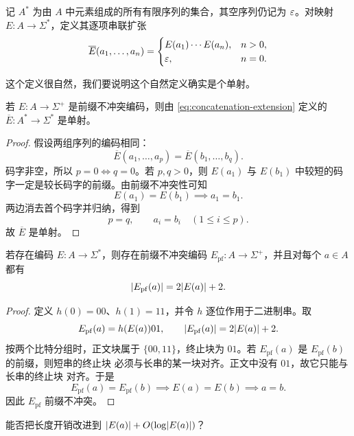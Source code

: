 记 $A^*$ 为由 $A$ 中元素组成的所有有限序列的集合，其空序列仍记为
$\varepsilon$。对映射 $E:A\to\Sigma^*$，定义其逐项串联扩张
\begin{equation}
  \label{eq:concatenation-extension}
  \overline E(a_1,\ldots,a_n)=
  \begin{cases}
    E(a_1)\cdots E(a_n), & n>0,\\
    \varepsilon, & n=0.
  \end{cases}
\end{equation}

这个定义很自然，我们要说明这个自然定义确实是个单射。

\begin{lemma}
  \label{lem:prefix-extension-injective}
  若 $E:A\to\Sigma^+$ 是前缀不冲突编码，则由
  \cref{eq:concatenation-extension} 定义的
  $\overline E:A^*\to\Sigma^*$ 是单射。
\end{lemma}

\begin{proof}
  假设两组序列的编码相同：
  \[
    \overline E(a_1,\ldots,a_p)
    =\overline E(b_1,\ldots,b_q).
  \]
  码字非空，所以 $p=0\iff q=0$。若 $p,q>0$，则
  $E(a_1)$ 与 $E(b_1)$ 中较短的码字一定是较长码字的前缀。由前缀不冲突性可知
  \[
    E(a_1)=E(b_1)
    \implies a_1=b_1.
  \]
  两边消去首个码字并归纳，得到
  \[
    p=q,\qquad a_i=b_i\quad(1\leq i\leq p).
  \]
  故 $\overline E$ 是单射。
\end{proof}

\begin{theorem}[构造前缀不冲突编码]
  \label{thm:prefix-free-construction}
  若存在编码 $E:A\to\Sigma^*$，则存在前缀不冲突编码
  $E_{\mathrm{pf}}:A\to\Sigma^+$，并且对每个 $a\in A$ 都有
  \[
    \lvert E_{\mathrm{pf}}(a)\rvert=2\lvert E(a)\rvert+2.
  \]
\end{theorem}

\begin{proof}
  定义 $h(0)=00$、$h(1)=11$，并令 $h$ 逐位作用于二进制串。取
  \[
    E_{\mathrm{pf}}(a)=h(E(a))01,
    \qquad
    \lvert E_{\mathrm{pf}}(a)\rvert=2\lvert E(a)\rvert+2.
  \]
  按两个比特分组时，正文块属于 $\{00,11\}$，终止块为 $01$。若
  $E_{\mathrm{pf}}(a)$ 是 $E_{\mathrm{pf}}(b)$ 的前缀，则短串的终止块
  必须与长串的某一块对齐。正文中没有 $01$，故它只能与长串的终止块
  对齐。于是
  \[
    E_{\mathrm{pf}}(a)=E_{\mathrm{pf}}(b)
    \implies E(a)=E(b)
    \implies a=b.
  \]
  因此 $E_{\mathrm{pf}}$ 前缀不冲突。
\end{proof}

\begin{question}
  能否把长度开销改进到
  $\lvert E(a)\rvert+O(\log \lvert E(a)\rvert)$？
\end{question}

